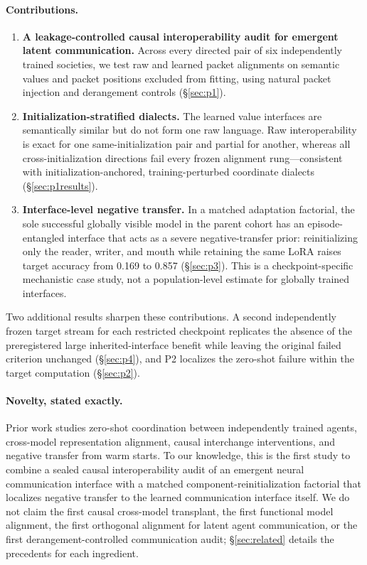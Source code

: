 \documentclass[11pt]{article}
\begin{document}
\paragraph{Contributions.}
\begin{enumerate}
\item \textbf{A leakage-controlled causal interoperability audit for emergent latent communication.} Across every directed pair of six independently trained societies, we test raw and learned packet alignments on semantic values and packet positions excluded from fitting, using natural packet injection and derangement controls (\S\ref{sec:p1}).
\item \textbf{Initialization-stratified dialects.} The learned value interfaces are semantically similar but do not form one raw language. Raw interoperability is exact for one same-initialization pair and partial for another, whereas all cross-initialization directions fail every frozen alignment rung---consistent with initialization-anchored, training-perturbed coordinate dialects (\S\ref{sec:p1results}).
\item \textbf{Interface-level negative transfer.} In a matched adaptation factorial, the sole successful globally visible model in the parent cohort has an episode-entangled interface that acts as a severe negative-transfer prior: reinitializing only the reader, writer, and mouth while retaining the same LoRA raises target accuracy from 0.169 to 0.857 (\S\ref{sec:p3}). This is a checkpoint-specific mechanistic case study, not a population-level estimate for globally trained interfaces.
\end{enumerate}

Two additional results sharpen these contributions. A second independently frozen target stream for each restricted checkpoint replicates the absence of the preregistered large inherited-interface benefit while leaving the original failed criterion unchanged (\S\ref{sec:p4}), and P2 localizes the zero-shot failure within the target computation (\S\ref{sec:p2}).

\paragraph{Novelty, stated exactly.}
Prior work studies zero-shot coordination between independently trained agents, cross-model representation alignment, causal interchange interventions, and negative transfer from warm starts. To our knowledge, this is the first study to combine a sealed causal interoperability audit of an emergent neural communication interface with a matched component-reinitialization factorial that localizes negative transfer to the learned communication interface itself. We do not claim the first causal cross-model transplant, the first functional model alignment, the first orthogonal alignment for latent agent communication, or the first derangement-controlled communication audit; \S\ref{sec:related} details the precedents for each ingredient.
\end{document}
